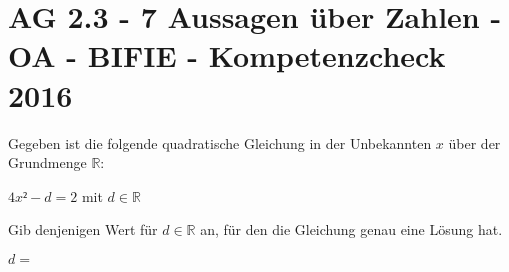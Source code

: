 \section{AG 2.3 - 7 Aussagen über Zahlen - OA - BIFIE - Kompetenzcheck 2016}

\begin{beispiel}[AG 2.3]{1} %
				Gegeben ist die folgende quadratische Gleichung in der Unbekannten $x$ über der Grundmenge $\mathbb{R}$:
\begin{center}
$4x²-d=2$ mit $d\in\mathbb{R}$
\end{center}

Gib denjenigen Wert für $d\in\mathbb{R}$ an, für den die Gleichung genau eine Lösung hat.


$d=$ 

\end{beispiel}	